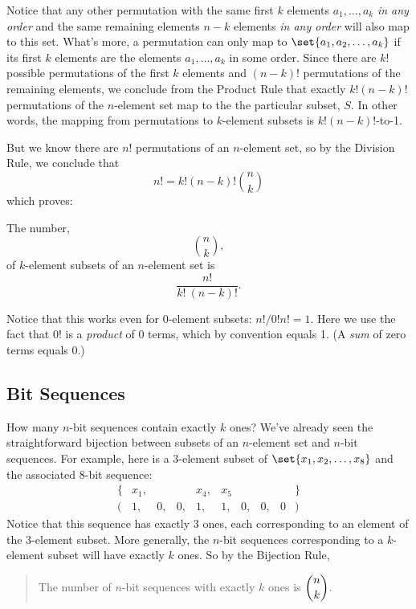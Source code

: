 Notice that any other permutation with the same first $k$ elements
$a_1,\dots,a_k$ \emph{in any order} and the same remaining elements $n-k$
elements \emph{in any order} will also map to this set.  What's more, a
permutation can only map to $\set{a_1,a_2,\dots,a_k}$ if its first $k$
elements are the elements $a_1,\dots,a_k$ in some order.  Since there are
$k!$ possible permutations of the first $k$ elements and $(n-k)!$
permutations of the remaining elements, we conclude from the Product Rule
that exactly $k!(n-k)!$ permutations of the $n$-element set map to the the
particular subset, $S$.  In other words, the mapping from permutations to
$k$-element subsets is $k!(n-k)!$-to-1.

But we know there are $n!$ permutations of an $n$-element set, so by the
Division Rule, we conclude that
\[
n!= k!(n-k)!\binom{n}{k}
\]
which proves:
\begin{mathrule}
\label{rule:subset}
The number,
\[
\binom{n}{k},
\]
of $k$-element subsets of an $n$-element set is
\[
\frac{n!}{k!\ (n-k)!}.
\]
\end{mathrule}

Notice that this works even for 0-element subsets: $n!/0!n! = 1$.  Here we
use the fact that $0!$ is a \emph{product} of 0 terms, which by convention
equals 1.  (A \emph{sum} of zero terms equals 0.)

\subsection{Bit Sequences}

How many $n$-bit sequences contain exactly $k$ ones?  We've already seen
the straightforward bijection between subsets of an $n$-element set and
$n$-bit sequences.  For example, here is a 3-element subset of $\set{x_1,
x_2, \ldots, x_8}$ and the associated 8-bit sequence:
%
\[
\begin{array}{rccccccccl}
\{ & x_1, &    &    & x_4, & x_5  &    &    &   & \} \\
(  &   1, & 0, & 0, &   1, &   1, & 0, & 0, & 0 & )
\end{array}
\]
Notice that this sequence has exactly 3 ones, each corresponding to an
element of the 3-element subset.  More generally, the $n$-bit sequences
corresponding to a $k$-element subset will have exactly $k$ ones.  So by
the Bijection Rule,
\begin{quote}
The number of $n$-bit sequences with exactly $k$ ones is $\dbinom{n}{k}$.
\end{quote}


